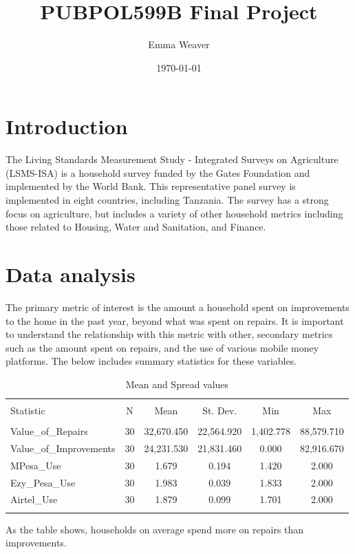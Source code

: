 \documentclass[11pt]{article}
\title{PUBPOL599B Final Project}
\author{
        Emma Weaver\\
}
\date{\today}
\begin{document}


\maketitle

\section{Introduction}\label{intro}
The Living Standards Measurement Study - Integrated Surveys on Agriculture (LSMS-ISA) is a household survey funded by the Gates Foundation and implemented by the World Bank. This representative panel survey is implemented in eight countries, including Tanzania. The survey has a strong focus on agriculture, but includes a variety of other household metrics including those related to Housing, Water and Sanitation, and Finance.

\section{Data analysis}\label{datas}

  The primary metric of interest is the amount a household spent on improvements to the home in the past year, beyond what was spent on repairs. It is important to understand the relationship with this metric with other, secondary metrics such as the amount spent on repairs, and the use of various mobile money platforms. The below includes summary statistics for these variables. 

\begin{table}[!htbp] \centering 
  \caption{Mean and Spread values} 
  \label{measures} 
\begin{tabular}{@{\extracolsep{5pt}}lccccc} 
\\[-1.8ex]\hline 
\hline \\[-1.8ex] 
Statistic & \multicolumn{1}{c}{N} & \multicolumn{1}{c}{Mean} & \multicolumn{1}{c}{St. Dev.} & \multicolumn{1}{c}{Min} & \multicolumn{1}{c}{Max} \\ 
\hline \\[-1.8ex] 
Value\_of\_Repairs & 30 & 32,670.450 & 22,564.920 & 1,402.778 & 88,579.710 \\ 
Value\_of\_Improvements & 30 & 24,231.530 & 21,831.460 & 0.000 & 82,916.670 \\ 
MPesa\_Use & 30 & 1.679 & 0.194 & 1.420 & 2.000 \\ 
Ezy\_Pesa\_Use & 30 & 1.983 & 0.039 & 1.833 & 2.000 \\ 
Airtel\_Use & 30 & 1.879 & 0.099 & 1.701 & 2.000 \\ 
\hline \\[-1.8ex] 
\end{tabular} 
\end{table}   As the table shows, households on average spend more on repairs than improvements. 
  
\end{document}
